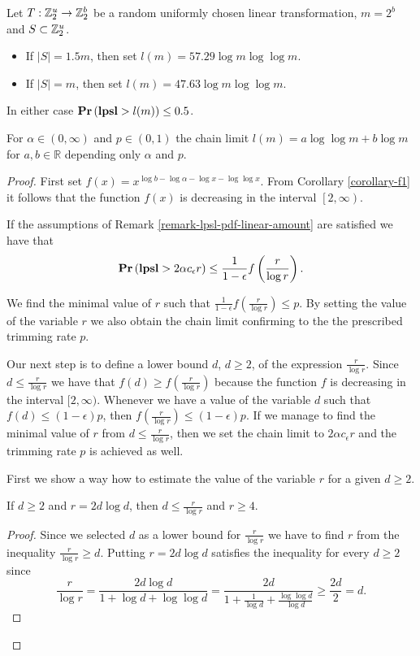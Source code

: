 \begin{theorem}
\label{theorem-model-chain-limit-rule}
Let $T: \mathbb{Z}_{2}^{u} \rightarrow \mathbb{Z}_{2}^{b}$ be a random uniformly chosen linear transformation, $m = 2 ^ b$ and $S \subset \mathbb{Z}_{2}^{u}$.
\begin{itemize}
\item If $|S| = 1.5 m$, then set $l(m) = 57.29 \log m \log \log m$.
\item If $|S| = m$, then set $l(m) = 47.63 \log m \log \log m$.
\end{itemize}
In either case $\mathbf{Pr}\left(\mathbf{lpsl} > l(m)\right) \leq 0.5$.

For $\alpha \in (0, \infty)$ and $p \in (0, 1)$ the chain limit $l(m) = a \log \log m + b \log m$ for $a, b \in \mathbb{R}$ depending only $\alpha$ and $p$.
\end{theorem}
\begin{proof}
First set $f(x) = x ^ {\log b - \log \alpha - \log x - \log \log x}$. From Corollary \ref{corollary-f1} it follows that the function $f(x)$ is decreasing in the interval $\left[2, \infty \right)$.

If the assumptions of Remark \ref{remark-lpsl-pdf-linear-amount} are satisfied we have that 
\[
	\mathbf{Pr}\left(\mathbf{lpsl} > 2 \alpha c_\epsilon r\right) \leq \frac{1}{1 - \epsilon} f\left(\frac{r}{\log r}\right) \text{.}
\]

We find the minimal value of $r$ such that $\frac{1}{1 - \epsilon} f\left(\frac{r}{\log r}\right) \leq p$. By setting the value of the variable $r$ we also obtain the chain limit confirming to the the prescribed trimming rate $p$. 

Our next step is to define a lower bound $d$, $d \geq 2$, of the expression $\frac{r}{\log r}$. Since $d \leq \frac{r}{\log r}$ we have that $f(d) \geq f\left(\frac{r}{\log r}\right)$ because the function $f$ is decreasing in the interval $[2, \infty)$. Whenever we have a value of the variable $d$ such that $f(d) \leq (1 - \epsilon) p$, then $f\left(\frac{r}{\log r}\right) \leq (1- \epsilon) p$. If we manage to find the minimal value of $r$ from $d \leq \frac{r}{\log r}$, then we set the chain limit to $2 \alpha c_\epsilon r$ and the trimming rate $p$ is achieved as well. 

First we show a way how to estimate the value of the variable $r$ for a given $d \geq 2$. 
\begin{claim}
\label{claim-choose-r}
If $d \geq 2$ and $r = 2d \log d$, then $d \leq \frac{r}{\log r}$ and $r \geq 4$.
\end{claim}
\begin{proof}
Since we selected $d$ as a lower bound for $\frac{r}{\log r}$ we have to find $r$ from the inequality $\frac{r}{\log r} \geq d$. Putting $r = 2 d \log d$ satisfies the inequality for every $d \geq 2$ since
\[
\frac{r}{\log r} = \frac{2 d \log d}{1 + \log d + \log \log d} = \frac{2 d}{1 + \frac{1}{\log d} + \frac{\log \log d}{\log d}} \geq \frac{2d}{2} = d \text{.}
\]


\end{proof}
\end{proof}
